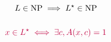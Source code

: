 \begin{frame}
  \[
	L \in \text{NP} \implies L^{\star} \in \text{NP}
  \]

  \pause
  \begin{columns}
	  
  \end{columns}

  \pause
  \vspace{0.60cm}
  \[
	\textcolor{purple}{x \in L^{\star} \iff \exists c, A(x,c) = 1}
  \]
\end{frame}
